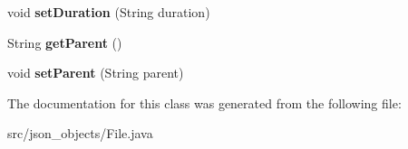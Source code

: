 \begin{DoxyCompactItemize}
\item 
\hypertarget{classjson__objects_1_1_file_a72438e9359053982670932b42896e6c2}{
void {\bfseries setDuration} (String duration)}
\label{classjson__objects_1_1_file_a72438e9359053982670932b42896e6c2}

\item 
\hypertarget{classjson__objects_1_1_file_ad2de4576435578d21eff5f6b1bd3019d}{
String {\bfseries getParent} ()}
\label{classjson__objects_1_1_file_ad2de4576435578d21eff5f6b1bd3019d}

\item 
\hypertarget{classjson__objects_1_1_file_a23c838865a948be3a1729567f704b19d}{
void {\bfseries setParent} (String parent)}
\label{classjson__objects_1_1_file_a23c838865a948be3a1729567f704b19d}

\end{DoxyCompactItemize}


The documentation for this class was generated from the following file:\begin{DoxyCompactItemize}
\item 
src/json\_\-objects/File.java\end{DoxyCompactItemize}
